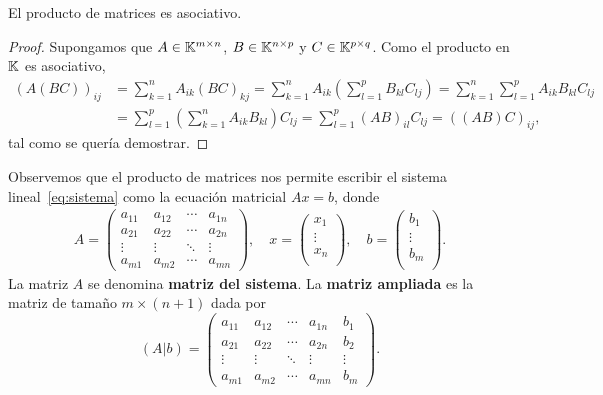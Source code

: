 \begin{thm}
	El producto de matrices es asociativo. 
	\begin{proof}
		Supongamos que $A\in\mathbb{K}^{m\times n}$, $B\in\mathbb{K}^{n\times p}$ y
		$C\in\mathbb{K}^{p\times q}$.  Como el producto en $\mathbb{K}$ es asociativo,
		\begin{align*}
			\left(A(BC)\right)_{ij}
			&=\sum_{k=1}^n A_{ik}(BC)_{kj}
			=\sum_{k=1}^n A_{ik}\left(\sum_{l=1}^p B_{kl}C_{lj}\right)
			=\sum_{k=1}^n\sum_{l=1}^p A_{ik}B_{kl}C_{lj}\\
			&=\sum_{l=1}^p\left(\sum_{k=1}^n A_{ik}B_{kl}\right)C_{lj}
			=\sum_{l=1}^p (AB)_{il}C_{lj}
			=\left((AB)C\right)_{ij},
		\end{align*}
		tal como se quería demostrar.
	\end{proof}
\end{thm}

\begin{block}
	Observemos que el producto de matrices nos permite escribir el sistema
	lineal~\eqref{eq:sistema} como la ecuación matricial $Ax=b$, donde
	\begin{align*}
		A=\begin{pmatrix}
			a_{11} & a_{12} & \cdots & a_{1n}\\
			a_{21} & a_{22} & \cdots & a_{2n}\\
			\vdots & \vdots & \ddots & \vdots\\
			a_{m1} & a_{m2} & \cdots & a_{mn}
		\end{pmatrix},\quad
		x=\begin{pmatrix}
			x_1\\
			\vdots\\
			x_n\\
		\end{pmatrix},\quad
		b=\begin{pmatrix}
			b_1\\
			\vdots\\
			b_m\\
		\end{pmatrix}.
	\end{align*}
    La matriz $A$ se denomina \textbf{matriz del sistema}. La \textbf{matriz
    ampliada} es la matriz de tamaño $m\times(n+1)$ dada por
	\[
		(A|b)=
        \left(\begin{array}{cccc|c}
			a_{11} & a_{12} & \cdots & a_{1n} & b_1\\
			a_{21} & a_{22} & \cdots & a_{2n} & b_2\\
			\vdots & \vdots & \ddots & \vdots & \vdots\\
			a_{m1} & a_{m2} & \cdots & a_{mn} & b_m
		\end{array}\right).
	\]
\end{block}

